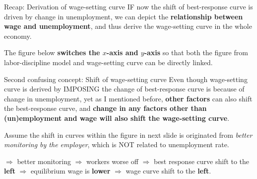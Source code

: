 \documentclass{beamer}
\begin{document}
\begin{frame}{Recap: Derivation of wage-setting curve}
\label{slide:Recap__Derivation_of_wage_setting_curve}
    IF now the shift of best-response curve is driven by change in unemployment, we can depict the \textbf{relationship between wage and unemployment}, and thus derive the wage-setting curve in the whole economy.

    The figure below \textbf{switches the $ x $-axis and $ y $-axis} so that both the figure from labor-discipline model and wage-setting curve can be directly linked.

\end{frame}


\begin{frame}
\end{frame}

\begin{frame}{Second confusing concept: Shift of wage-setting curve}
\label{slide:Second_confusing_concept__Shift_of_wage_setting_curve}
    Even though wage-setting curve is derived by IMPOSING the change of best-response curve is because of change in unemployment, yet as I mentioned before, \textbf{other factors} can also shift the best-response curve, and \textbf{change in any factors other than (un)employment and wage will also shift the wage-setting curve}.

    Assume the shift in curves within the figure in next slide is originated from \textit{better monitoring by the employer}, which is NOT related to unemployment rate.

    $ \Rightarrow  $ better monitoring $ \Rightarrow  $ workers worse off $ \Rightarrow  $ best response curve shift to the \textbf{left} $ \Rightarrow  $ equilibrium wage is \textbf{lower} $ \Rightarrow  $ wage curve shift to the \textbf{left}.

\end{frame}
\end{document}
